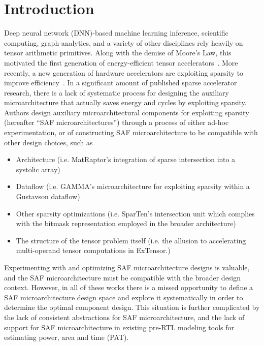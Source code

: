 \chapter{Introduction}

Deep neural network (DNN)-based machine learning inference, scientific computing, graph analytics, and a variety of other disciplines rely heavily on tensor arithmetic primitives. Along with the demise of Moore's Law, this motivated the first generation of energy-efficient tensor accelerators~\cite{eyeriss}. More recently, a new generation of hardware accelerators are exploiting sparsity to improve efficiency~\cite{ampere}\cite{eyerissv2}\cite{sparten}\cite{sparch}\cite{scnn}\cite{candles}\cite{extensor}. In a significant amount of published sparse accelerator research, there is a lack of systematic process for designing the auxiliary microarchitecture that actually saves energy and cycles by exploiting sparsity. Authors design auxiliary microarchitectural components for exploiting sparsity (hereafter ``SAF microarchitectures'') through a process of either ad-hoc experimentation, or of constructing SAF microarchitecture to be compatible with other design choices, such as

\begin{itemize}

\item Architecture (i.e. MatRaptor's integration of sparse intersection into a systolic array\cite{matraptor})
\item Dataflow (i.e. GAMMA's microarchitecture for exploiting sparsity within a Gustavson dataflow\cite{gamma})
\item Other sparsity optimizations (i.e. SparTen's intersection unit which complies with the bitmask representation employed in the broader architecture\cite{sparten})
\item The structure of the tensor problem itself (i.e. the allusion to accelerating multi-operand tensor computations in ExTensor\cite{extensor}.) 
\end{itemize}

Experimenting with and optimizing SAF microarchitecture designs is valuable, and the SAF microarchitecture must be compatible with the broader design context. However, in all of these works there is a missed opportunity to define a SAF microarchitecture design space and explore it systematically in order to determine the optimal component design. This situation is further complicated by the lack of consistent abstractions for SAF microarchitecture, and the lack of support for SAF microarchitecture in existing pre-RTL modeling tools for estimating power, area and time (PAT)\cite{accelergy}. 

